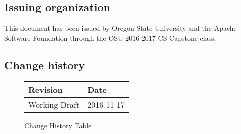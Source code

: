 \subsection{Issuing organization}

This document has been issued by Oregon State University and the Apache Software Foundation through the OSU 2016-2017 CS Capstone class.

\subsection{Change history}
\begin{figure}[hp]
  \centering
  \captionsetup{justification=centering,margin=2cm}
    \begin{tabular}{ | p{5cm} | p{5cm} |}
    \hline
      Revision & Date\\ \hline
      Working Draft & 2016-11-17 \\ \hline
    \end{tabular}
  \caption{Change History Table}
\end{figure}